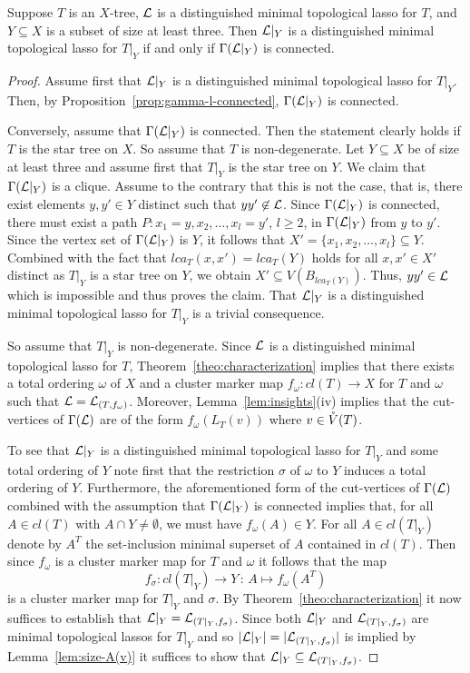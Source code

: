 \begin{thm}\label{theo:subtree}
Suppose $T$ is an $X$-tree, ${\mathcal L}$ is a distinguished minimal
topological lasso for $T$, and $Y\subseteq X$ is a subset of size 
at least three. Then  ${\mathcal L}|_Y$ is a distinguished
minimal topological lasso for $T|_Y$ if and only if $\Gamma({\mathcal L}|_Y)$
is connected.
\end{thm}
\begin{proof}
Assume first that ${\mathcal L}|_Y$ is a distinguished minimal topological
lasso for $T|_Y$. Then, by Proposition~\ref{prop:gamma-l-connected},
$\Gamma({\mathcal L}|_Y)$ is connected.

Conversely, assume that $\Gamma({\mathcal L}|_Y)$ is connected. Then the statement
clearly holds if $T$ is the star tree on $X$. So assume that $T$ is 
non-degenerate. Let $Y\subseteq X$ be of size at least three
and assume first that $T|_Y$ is the star tree on $Y$. We claim that 
 $\Gamma({\mathcal L}|_Y)$ is a clique. Assume to the contrary that
this is not the case, that is, there exist elements
$y,y'\in Y$ distinct such that $yy'\not\in {\mathcal L}$. Since $\Gamma({\mathcal L}|_Y)$
is connected, there must exist a path $P:x_1=y,x_2,\ldots,x_l=y'$,
$l\geq 2$, in $\Gamma({\mathcal L}|_Y)$ from $y$ to $y'$. Since 
the vertex set of $\Gamma({\mathcal L}|_Y)$ is $Y$, it follows that
$X'=\{x_1,x_2,\ldots,x_l\}\subseteq Y$. Combined with the 
fact that $lca_T(x,x')=lca_T(Y)$ holds for all $x,x'\in X'$ distinct
as $T|_Y$ is a star tree on $Y$, we obtain $X'\subseteq V(B_{lca_T(Y)})$.
Thus, $yy'\in {\mathcal L}$ which is impossible and thus proves the claim.
That ${\mathcal L}|_Y$ is a distinguished minimal topological lasso for $T|_Y$
is a trivial consequence.

So assume that $T|_Y$ is
non-degenerate. Since ${\mathcal L}$ is a distinguished minimal topological
lasso for $T$, 
Theorem~\ref{theo:characterization} implies that 
there exists a total ordering $\omega$ of $X$ and a cluster
marker map $f_{\omega}: cl(T)\to X$ for $T$ and $\omega$ such
that ${\mathcal L}={\mathcal L}_{(T,f_{\omega})}$. Moreover, Lemma~\ref{lem:insights}(iv) 
implies that the cut-vertices
of $\Gamma({\mathcal L})$ are of the form $f_{\omega}(L_T(v))$ where $v\in \mathring{V}(T)$.

To see that ${\mathcal L}|_Y$ is a distinguished minimal topological lasso
for $T|_Y$ and some total ordering of $Y$ note first that 
the restriction $\sigma$ of $\omega$ to $Y$ induces 
a total ordering of $Y$.
Furthermore, the aforementioned form
of the cut-vertices of $\Gamma({\mathcal L})$ 
combined with the assumption that $\Gamma({\mathcal L}|_Y)$ is connected
implies that, for all $A\in cl(T)$ with 
$A\cap Y\not=\emptyset$, we must have
$f_{\omega}(A)\in Y$. For all $A\in cl(T|_Y)$ denote by $A^T$ the 
set-inclusion minimal superset of $A$ contained in $cl(T)$. 
Then since $f_{\omega}$ is a cluster marker map for $T$
and $\omega$ it follows that
the map 
$$
f_{\sigma}:cl(T|_Y)\to Y\,:\, A\mapsto f_{\omega}(A^T)
$$
 is a cluster marker map for $T|_Y$ and $\sigma$.
By Theorem~\ref{theo:characterization} it now suffices to establish that
${\mathcal L}|_Y={\mathcal L}_{(T|_Y,f_{\sigma})}$. Since both ${\mathcal L}|_Y$ and
${\mathcal L}_{(T|_Y,f_{\sigma})}$ are minimal topological lassos for 
$T|_Y$ and so $|{\mathcal L}|_Y|=|{\mathcal L}_{(T|_Y,f_{\sigma})}|$ is implied 
by Lemma~\ref{lem:size-A(v)} it suffices
to show that ${\mathcal L}|_Y\subseteq {\mathcal L}_{(T|_Y,f_{\sigma})}$.


\end{proof}
